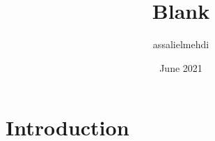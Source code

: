 \documentclass{article}
\title{Blank}
\author{assalielmehdi}
\date{June 2021}
\begin{document}
    \maketitle


    \section{Introduction}
\end{document}
